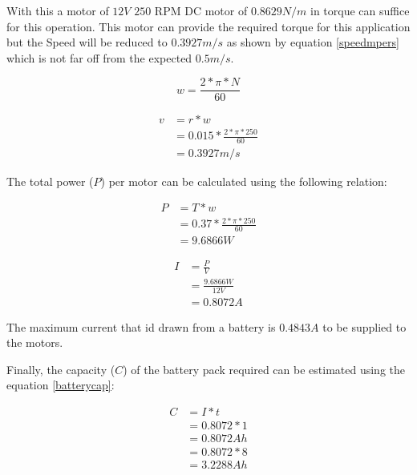 With this a motor of $12V$ $250$ \ac{RPM} \ac{DC} motor of $0.8629 N/m$ in torque can suffice for this operation. This motor can provide the required torque for this application but the Speed will be reduced to $0.3927 m/s$ as shown by equation \ref{speedmpers} which is not far off from the expected $0.5 m/s$.

\begin{equation} \label{speedRadians}
w = \frac{2 * \pi * N}{60}
\end{equation}

\begin{equation} \label{speedmpers}
\begin{split}
v & = r * w\\
& = 0.015 * \frac{2 * \pi * 250}{60} \\
& = 0.3927 m/s 
\end{split}
\end{equation}

The total power ($P$) per motor can be calculated using the following relation:


\begin{equation} \label{totalefficiency}
\begin{split}
P & = T * w\\
& = 0.37 * \frac{2 * \pi * 250}{60} \\
& = 9.6866W 
\end{split}
\end{equation}

\begin{equation} \label{totalefficiency}
\begin{split}
I & = \frac{P}{V}\\
& = \frac{9.6866 W}{12 V} \\
& = 0.8072 A
\end{split}
\end{equation}


The maximum current that id drawn from a battery is $0.4843A$ to be supplied to the motors.

Finally, the capacity ($C$) of the battery pack required can be estimated using the equation \ref{batterycap}:

\begin{equation} \label{batterycap}
\begin{split}
C & = I * t\\
& = 0.8072 * 1 \\
& = 0.8072Ah \\
& = 0.8072 * 8 \\ 
& = 3.2288 Ah \\
\end{split}
\end{equation}

